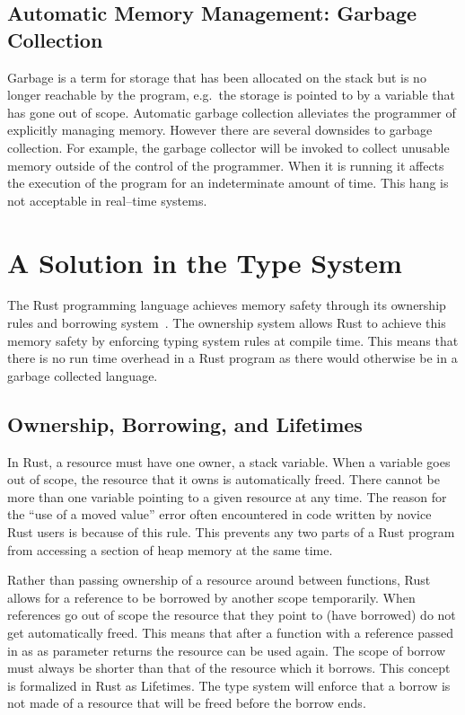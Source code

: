 

\subsection{Automatic Memory Management: Garbage Collection}
Garbage is a term for storage that has been allocated on the stack but is no
longer reachable by the program, e.g.\ the storage is pointed to by a variable
that has gone out of scope.  Automatic garbage collection alleviates the
programmer of explicitly managing memory. However there are several downsides
to garbage collection. For example, the garbage collector will be invoked to
collect unusable memory outside of the control of the programmer. When it is
running it affects the execution of the program for an indeterminate amount
of time.  This hang is not acceptable in real--time systems.

\section{A Solution in the Type System}
The Rust programming language achieves memory safety through its ownership
rules and borrowing system~\cite{rust-borrowing}. The ownership system allows
Rust to achieve this memory safety by enforcing typing system rules at compile
time. This means that there is no run time overhead in a Rust program as there
would otherwise be in a garbage collected language.

\subsection{Ownership, Borrowing, and Lifetimes} \label{sec:regions}
In Rust, a resource must have one owner, a stack variable. When a variable goes
out of scope, the resource that it owns is automatically freed. There cannot
be more than one variable pointing to a given resource at any time. The reason
for the ``use of a moved value'' error often encountered in code written
by novice Rust users is because of this rule. This prevents any two parts
of a Rust program from accessing a section of heap memory at the same time.

Rather than passing ownership of a resource around between functions, Rust
allows for a reference to be borrowed by another scope temporarily. When
references go out of scope the resource that they point to (have borrowed) do
not get automatically freed. This means that after a function with a
reference passed in as as parameter returns the resource can be used again.
The scope of borrow must always be shorter than that of the resource which it
borrows. This concept is formalized in Rust as Lifetimes. The type system will
enforce that a borrow is not made of a resource that will be freed before the
borrow ends.


